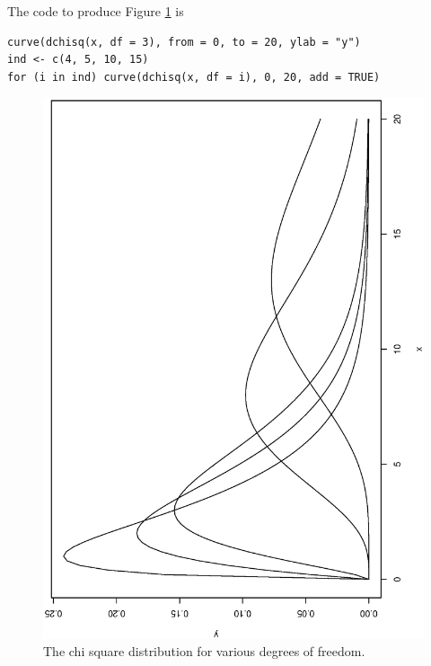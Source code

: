 \documentclass[captions=tableheading]{scrbook}
\begin{document}
The code to produce Figure \ref{fig-chisq-dist-vary-df} is


\begin{verbatim}
curve(dchisq(x, df = 3), from = 0, to = 20, ylab = "y")
ind <- c(4, 5, 10, 15)
for (i in ind) curve(dchisq(x, df = i), 0, 20, add = TRUE)
\end{verbatim}





\begin{figure}[th]
  \includegraphics[angle=270, totalheight=4in]{ps/contdist/chisq-dist-vary-df.ps}
  \caption[Chi square distribution for various degrees of freedom]{\small The chi square distribution for various degrees of freedom.}
  \label{fig-chisq-dist-vary-df}
\end{figure}
\end{document}
